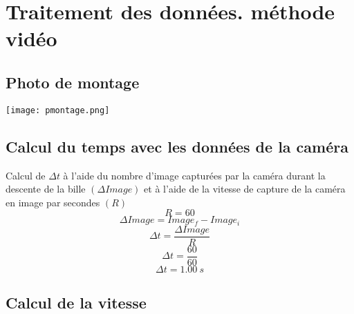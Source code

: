 \documentclass{article}
\begin{document}
        \section{Traitement des données. méthode vidéo}
            \vspace{4mm}
            \subsection{Photo de montage}
                \texttt{[image: pmontage.png]}
                \vspace{8mm}
            \subsection{Calcul du temps avec les données de la caméra}

                Calcul de $ \Delta t $ à l’aide du nombre d’image capturées par la caméra  durant la descente de la bille $( \Delta Image)$ et à l’aide de la vitesse de capture de la caméra en image par secondes $(R)$
                \setcounter{equation}{0}
                \vspace{5mm}
                \begin{equation}
                    R = 60
                \end{equation}
                \vspace{5mm}
                \begin{equation}
                    \Delta Image = Image_f - Image_i
                \end{equation}
                \vspace{5mm}
                \begin{equation}
                    \Delta t = \frac{\Delta Image}{R}
                \end{equation}
                \vspace{5mm}
                \begin{equation}
                    \Delta t = \frac{60}{60}
                \end{equation}
                \vspace{5mm}
                \begin{equation}
                    \Delta t = 1.00 \ s
                \end{equation}
                \vspace{10mm}
            \subsection{Calcul de la vitesse}
\end{document}
